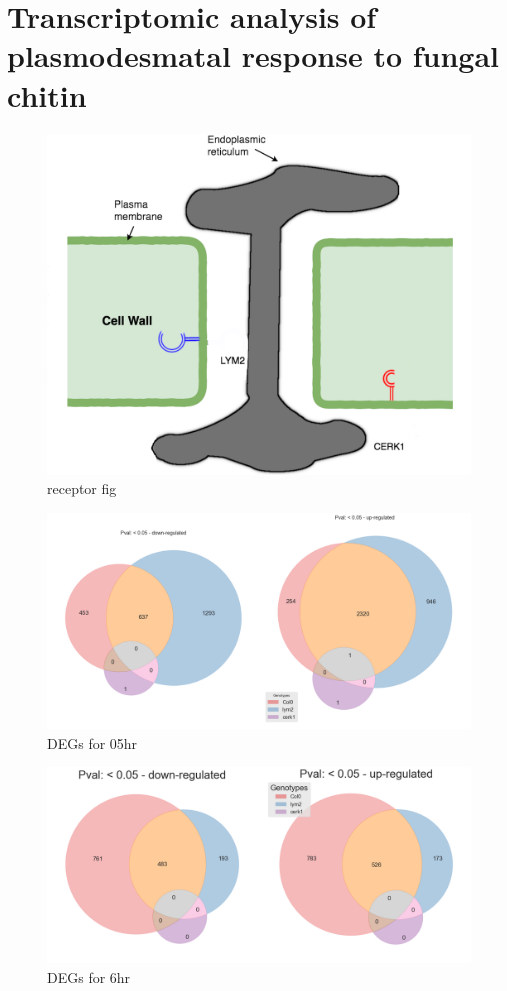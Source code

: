 \documentclass[../main.tex]{subfiles}
\begin{document}
\chapter{Transcriptomic analysis of plasmodesmatal response to fungal chitin}
\label{cha:transcripts}


\begin{figure}[ht]
  \centering
  \includegraphics[width=0.5\columnwidth]{figures/original desmotubule.png}
  \caption{\label{fig:receptors} receptor fig}
\end{figure}



\begin{figure}[ht]
  \centering
  \includegraphics[width=\columnwidth]{figures/vennTreatmentschitin.png}
  \caption{\label{fig:05hrDEGs} DEGs for 05hr}
\end{figure}



\begin{figure}[ht]
  \centering
  \includegraphics[width=\columnwidth]{figures/vennTreatmentschitin6.png}
  \caption{\label{fig:6hrDEGs} DEGs for 6hr}
\end{figure}
\end{document}
